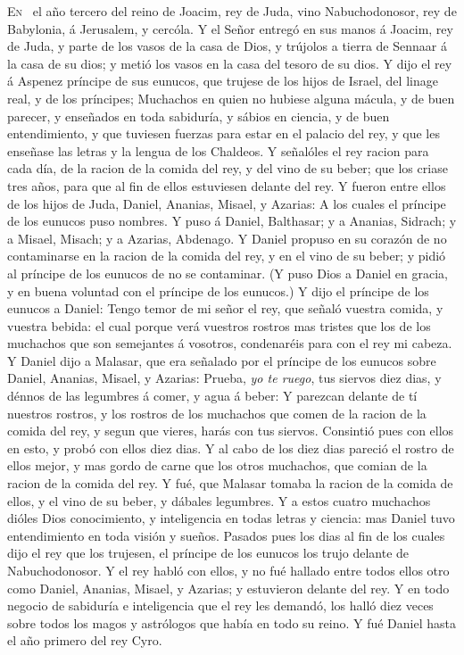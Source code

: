 \bversenonum \lettrine[lines=6,loversize=0.05,lraise=+0.08]{E}{n}%
\, el año tercero del reino de Joacim, rey de Juda, vino Nabuchodonosor, rey de Babylonia, á Jerusalem, y cercóla.
\bverse Y el Señor entregó en sus manos á Joacim, rey de Juda, y parte de los vasos de la casa de Dios, y trújolos a tierra de Sennaar á la casa de su dios; y metió los vasos en la casa del tesoro de su dios.
\bverse Y dijo el rey á Aspenez príncipe de sus eunucos, que trujese de los hijos de Israel, del linage real, y de los príncipes;
\bverse Muchachos en quien no hubiese alguna mácula, y de buen parecer, y enseñados en toda sabiduría, y sábios en ciencia, y de buen entendimiento, y que tuviesen fuerzas para estar en el palacio del rey, y que les enseñase las letras y la lengua de los Chaldeos.
\bverse Y señalóles el rey racion para cada día, de la racion de la comida del rey, y del vino de su beber; que los criase tres años, para que al fin de ellos estuviesen delante del rey.
\bverse Y fueron entre ellos de los hijos de Juda, Daniel, Ananias, Misael, y Azarias:
\bverse A los cuales el príncipe de los eunucos puso nombres. Y puso á Daniel, Balthasar; y a Ananias, Sidrach; y a Misael, Misach; y a Azarias, Abdenago.
\bverse Y Daniel propuso en su corazón de no contaminarse en la racion de la comida del rey, y en el vino de su beber; y pidió al príncipe de los eunucos de no se contaminar.
\bverse (Y puso Dios a Daniel en gracia, y en buena voluntad con el príncipe de los eunucos.)
\bverse Y dijo el príncipe de los eunucos a Daniel: Tengo temor de mi señor el rey, que señaló vuestra comida, y vuestra bebida: el cual porque verá vuestros rostros mas tristes que los de los muchachos que son semejantes á vosotros, condenaréis para con el rey mi cabeza.
\bverse Y Daniel dijo a Malasar, que era señalado por el príncipe de los eunucos sobre Daniel, Ananias, Misael, y Azarias:
\bverse Prueba, \emph{yo te ruego}, tus siervos diez dias, y dénnos de las legumbres á comer, y agua á beber:
\bverse Y parezcan delante de tí nuestros rostros, y los rostros de los muchachos que comen de la racion de la comida del rey, y segun que vieres, harás con tus siervos.
\bverse Consintió pues con ellos en esto, y probó con ellos diez dias.
\bverse Y al cabo de los diez dias pareció el rostro de ellos mejor, y mas gordo de carne que los otros muchachos, que comian de la racion de la comida del rey.
\bverse Y fué, que Malasar tomaba la racion de la comida de ellos, y el vino de su beber, y dábales legumbres.
\bverse Y a estos cuatro muchachos dióles Dios conocimiento, y inteligencia en todas letras y ciencia: mas Daniel tuvo entendimiento en toda visión y sueños.
\bverse Pasados pues los dias al fin de los cuales dijo el rey que los trujesen, el príncipe de los eunucos los trujo delante de Nabuchodonosor.
\bverse Y el rey habló con ellos, y no fué hallado entre todos ellos otro como Daniel, Ananias, Misael, y Azarias; y estuvieron delante del rey.
\bverse Y en todo negocio de sabiduría e inteligencia que el rey les demandó, los halló diez veces sobre todos los magos y astrólogos que había en todo su reino.
\bverse Y fué Daniel hasta el año primero del rey Cyro.

